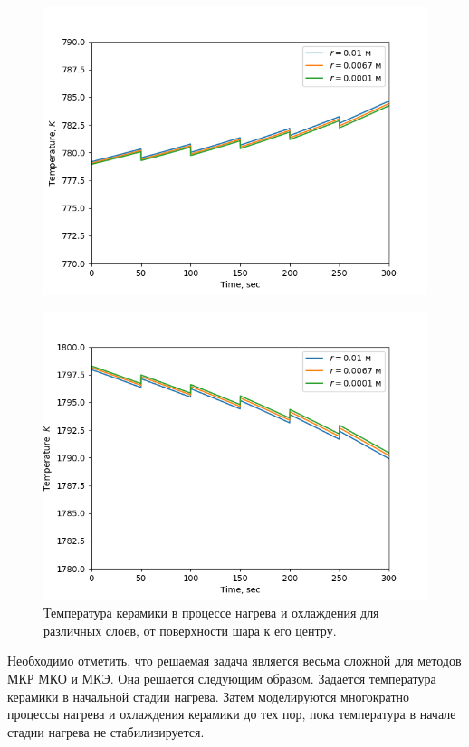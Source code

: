 \documentclass[a4paper,12pt]{article}
\begin{document}
\begin{figure}[ht]
    \begin{minipage}[t]{0.49\textwidth}
        \centering
        \includegraphics[width=\textwidth]{img3}
        \label{fig:img2}
    \end{minipage}
    \hfill
    \begin{minipage}[t]{0.49\textwidth}
        \centering
        \includegraphics[width=\textwidth]{img4}
    \end{minipage}
    \caption {Температура керамики в процессе нагрева и охлаждения для
    различных слоев, от поверхности шара к его центру.}
\end{figure}

Необходимо отметить, что решаемая задача является весьма сложной для
методов МКР МКО и МКЭ. Она решается следующим образом. Задается
температура керамики в начальной стадии нагрева. Затем моделируются
многократно процессы нагрева и охлаждения керамики до тех пор, пока
температура в начале стадии нагрева не стабилизируется. 
\end{document}
